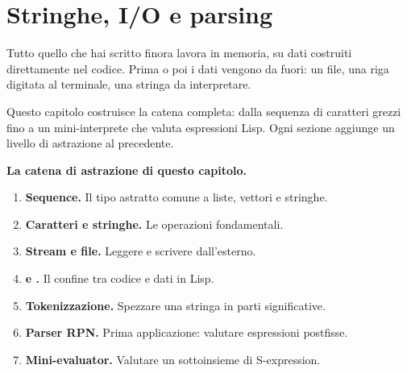 
\chapter{Stringhe, I/O e parsing}

\begin{intuizione}
Tutto quello che hai scritto finora lavora in memoria,
su dati costruiti direttamente nel codice.
Prima o poi i dati vengono da fuori: un file, una riga
digitata al terminale, una stringa da interpretare.

\medskip
Questo capitolo costruisce la catena completa:
dalla sequenza di caratteri grezzi fino a un mini-interprete
che valuta espressioni Lisp.
Ogni sezione aggiunge un livello di astrazione al precedente.
\end{intuizione}

\begin{tcolorbox}[
  enhanced,
  colback=black!2, colframe=black!20,
  arc=3pt, boxrule=0.4pt,
  left=12pt, right=12pt, top=9pt, bottom=9pt,
  before skip=8pt, after skip=10pt
]
\small\color{black!65}

\textbf{La catena di astrazione di questo capitolo.}

\medskip
\begin{enumerate}
  \item \textbf{Sequence.} Il tipo astratto comune a liste, vettori e stringhe.
  \item \textbf{Caratteri e stringhe.} Le operazioni fondamentali.
  \item \textbf{Stream e file.} Leggere e scrivere dall'esterno.
  \item \textbf{ e .} Il confine tra codice e dati in Lisp.
  \item \textbf{Tokenizzazione.} Spezzare una stringa in parti significative.
  \item \textbf{Parser RPN.} Prima applicazione: valutare espressioni postfisse.
  \item \textbf{Mini-evaluator.} Valutare un sottoinsieme di S-expression.
\end{enumerate}
\end{tcolorbox}

\vspace{4pt}

